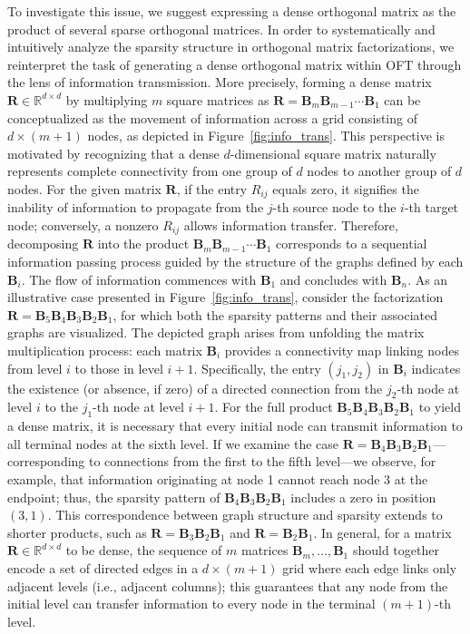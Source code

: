 To investigate this issue, we suggest expressing a dense orthogonal matrix as the product of several sparse orthogonal matrices. In order to systematically and intuitively analyze the sparsity structure in orthogonal matrix factorizations, we reinterpret the task of generating a dense orthogonal matrix within OFT through the lens of information transmission. More precisely, forming a dense matrix $\bm{R}\in\mathbb{R}^{d\times d}$ by multiplying $m$ square matrices as $\bm{R}=\bm{B}_m\bm{B}_{m-1}\cdots\bm{B}_1$ can be conceptualized as the movement of information across a grid consisting of $d\times (m+1)$ nodes, as depicted in Figure~\ref{fig:info_trans}. This perspective is motivated by recognizing that a dense $d$-dimensional square matrix naturally represents complete connectivity from one group of $d$ nodes to another group of $d$ nodes. For the given matrix $\bm{R}$, if the entry $R_{ij}$ equals zero, it signifies the inability of information to propagate from the $j$-th source node to the $i$-th target node; conversely, a nonzero $R_{ij}$ allows information transfer. Therefore, decomposing $\bm{R}$ into the product $\bm{B}_m\bm{B}_{m-1}\cdots\bm{B}_1$ corresponds to a sequential information passing process guided by the structure of the graphs defined by each $\bm{B}_i$. The flow of information commences with $\bm{B}_1$ and concludes with $\bm{B}_n$. As an illustrative case presented in Figure~\ref{fig:info_trans}, consider the factorization $\bm{R}=\bm{B}_5\bm{B}_4\bm{B}_3\bm{B}_2\bm{B}_1$, for which both the sparsity patterns and their associated graphs are visualized. The depicted graph arises from unfolding the matrix multiplication process: each matrix $\bm{B}_i$ provides a connectivity map linking nodes from level $i$ to those in level $i+1$. Specifically, the entry $(j_1, j_2)$ in $\bm{B}_i$ indicates the existence (or absence, if zero) of a directed connection from the $j_2$-th node at level $i$ to the $j_1$-th node at level $i+1$. For the full product $\bm{B}_5\bm{B}_4\bm{B}_3\bm{B}_2\bm{B}_1$ to yield a dense matrix, it is necessary that every initial node can transmit information to all terminal nodes at the sixth level. If we examine the case $\bm{R}=\bm{B}_4\bm{B}_3\bm{B}_2\bm{B}_1$—corresponding to connections from the first to the fifth level—we observe, for example, that information originating at node 1 cannot reach node 3 at the endpoint; thus, the sparsity pattern of $\bm{B}_4\bm{B}_3\bm{B}_2\bm{B}_1$ includes a zero in position $(3,1)$. This correspondence between graph structure and sparsity extends to shorter products, such as $\bm{R}=\bm{B}_3\bm{B}_2\bm{B}_1$ and $\bm{R}=\bm{B}_2\bm{B}_1$. In general, for a matrix $\bm{R}\in\mathbb{R}^{d\times d}$ to be dense, the sequence of $m$ matrices $\bm{B}_m, \dots, \bm{B}_1$ should together encode a set of directed edges in a $d\times(m+1)$ grid where each edge links only adjacent levels (i.e., adjacent columns); this guarantees that any node from the initial level can transfer information to every node in the terminal $(m+1)$-th level.

